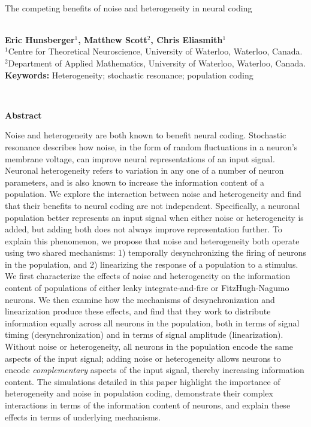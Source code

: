 \documentclass[12pt]{article}
\begin{document}
\hspace{13.9cm}

\ \vspace{20mm}\\

{\LARGE The competing benefits of noise and heterogeneity in neural coding}

\ \\
{\bf \large Eric Hunsberger$^{\displaystyle 1}$, Matthew Scott$^{\displaystyle 2}$, Chris Eliasmith$^{\displaystyle 1}$}\\
{$^{\displaystyle 1}$Centre for Theoretical Neuroscience, University of Waterloo, Waterloo, Canada.}\\
{$^{\displaystyle 2}$Department of Applied Mathematics, University of Waterloo, Waterloo, Canada.}\\
%

{\bf Keywords:} Heterogeneity; stochastic resonance; population coding

\thispagestyle{empty}
%
\ \vspace{-0mm}\\
%
\begin{center} {\bf Abstract} \end{center}

Noise and heterogeneity are both known to benefit neural coding.
Stochastic resonance describes how noise,
in the form of random fluctuations in a neuron's membrane voltage,
can improve neural representations of an input signal.
Neuronal heterogeneity refers to variation in any one of a number of neuron parameters,
and is also known to increase the information content of a population.
We explore the interaction between noise and heterogeneity
and find that their benefits to neural coding are not independent.
Specifically, a neuronal population better represents an input signal
when either noise or heterogeneity is added,
but adding both does not always improve representation further.
To explain this phenomenon, we propose
that noise and heterogeneity both operate using two shared mechanisms:
1) temporally desynchronizing the firing of neurons in the population,
and 2) linearizing the response of a population to a stimulus.
We first characterize the effects of noise and heterogeneity
on the information content of populations of
either leaky integrate-and-fire or FitzHugh-Nagumo neurons.
We then examine how the mechanisms
of desynchronization and linearization produce these effects,
and find that they work to distribute information equally across all neurons in the population,
both in terms of signal timing (desynchronization) and in terms of signal amplitude (linearization).
Without noise or heterogeneity,
all neurons in the population encode the same aspects of the input signal;
adding noise or heterogeneity allows neurons
to encode \emph{complementary} aspects of the input signal,
thereby increasing information content.
The simulations detailed in this paper
highlight the importance of heterogeneity and noise in population coding,
demonstrate their complex interactions in terms of the information content of neurons,
and explain these effects in terms of underlying mechanisms.
\end{document}
